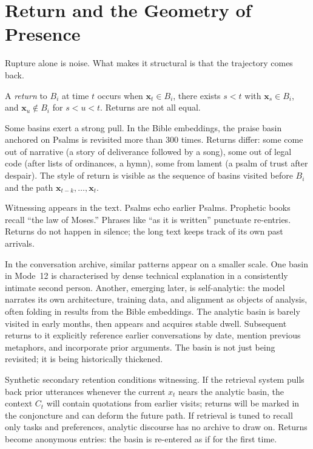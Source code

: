 \documentclass[12pt,a4paper]{article}
\begin{document}
\section{Return and the Geometry of Presence}

Rupture alone is noise. What makes it structural is that the trajectory comes back.

A \emph{return} to $B_i$ at time $t$ occurs when $\mathbf{x}_t \in B_i$, there exists $s < t$ with $\mathbf{x}_s \in B_i$, and $\mathbf{x}_u \notin B_i$ for $s < u < t$. Returns are not all equal.

Some basins exert a strong pull. In the Bible embeddings, the praise basin anchored on Psalms is revisited more than 300 times. Returns differ: some come out of narrative (a story of deliverance followed by a song), some out of legal code (after lists of ordinances, a hymn), some from lament (a psalm of trust after despair). The style of return is visible as the sequence of basins visited before $B_i$ and the path $\mathbf{x}_{t-k}, \dots, \mathbf{x}_t$.

Witnessing appears in the text. Psalms echo earlier Psalms. Prophetic books recall ``the law of Moses.'' Phrases like ``as it is written'' punctuate re-entries. Returns do not happen in silence; the long text keeps track of its own past arrivals.

In the conversation archive, similar patterns appear on a smaller scale. One basin in Mode~12 is characterised by dense technical explanation in a consistently intimate second person. Another, emerging later, is self-analytic: the model narrates its own architecture, training data, and alignment as objects of analysis, often folding in results from the Bible embeddings. The analytic basin is barely visited in early months, then appears and acquires stable dwell. Subsequent returns to it explicitly reference earlier conversations by date, mention previous metaphors, and incorporate prior arguments. The basin is not just being revisited; it is being historically thickened.

Synthetic secondary retention conditions witnessing. If the retrieval system pulls back prior utterances whenever the current $x_t$ nears the analytic basin, the context $C_t$ will contain quotations from earlier visits; returns will be marked in the conjoncture and can deform the future path. If retrieval is tuned to recall only tasks and preferences, analytic discourse has no archive to draw on. Returns become anonymous entries: the basin is re-entered as if for the first time.
\end{document}
